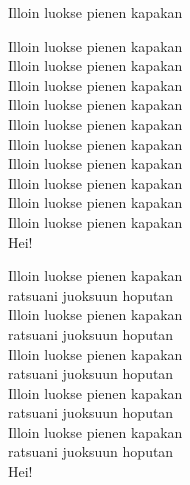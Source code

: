 \begin{song}{Illoin luokse pienen kapakan}

	
	Illoin luokse pienen kapakan\\
	Illoin luokse pienen kapakan\\
	Illoin luokse pienen kapakan\\
	Illoin luokse pienen kapakan\\
	Illoin luokse pienen kapakan\\
	Illoin luokse pienen kapakan\\
	Illoin luokse pienen kapakan\\
	Illoin luokse pienen kapakan\\
	Illoin luokse pienen kapakan\\
	Illoin luokse pienen kapakan\\
    Hei!

	Illoin luokse pienen kapakan\\
    ratsuani juoksuun hoputan\\
    Illoin luokse pienen kapakan\\
    ratsuani juoksuun hoputan\\
    Illoin luokse pienen kapakan\\
    ratsuani juoksuun hoputan\\
    Illoin luokse pienen kapakan\\
    ratsuani juoksuun hoputan\\
    Illoin luokse pienen kapakan\\
    ratsuani juoksuun hoputan\\
    Hei!
	
\end{song}